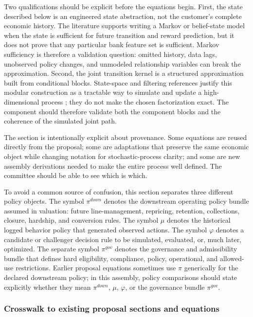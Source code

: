\documentclass[11pt]{article}
\newcommand{\1}{\mathbf{1}}
\begin{document}
Two qualifications should be explicit before the equations begin. First, the
state described below is an engineered state abstraction, not the customer's
complete economic history. The literature supports writing a Markov or
belief-state model when the state is sufficient for future transition and reward
prediction, but it does not prove that any particular bank feature set is
sufficient. Markov sufficiency is therefore a validation question: omitted
history, data lags, unobserved policy changes, and unmodeled relationship
variables can break the approximation. Second, the joint transition kernel is a
structured approximation built from conditional blocks. State-space and
filtering references justify this modular construction as a tractable way to
simulate and update a high-dimensional process
\citep{durbinkoopman2012ssm,westharrison1997bfdm,doucet2001smc,
ledoux2005recursivefilters}; they do not make the chosen factorization exact.
The component should therefore validate both the component blocks and the
coherence of the simulated joint path.

The section is intentionally explicit about provenance. Some equations are
reused directly from the proposal; some are adaptations that preserve the same
economic object while changing notation for stochastic-process clarity; and some
are new assembly derivations needed to make the entire process well defined. The
committee should be able to see which is which.

To avoid a common source of confusion, this section separates three different
policy objects. The symbol $\pi^{down}$ denotes the downstream operating policy
bundle assumed in valuation: future line-management, repricing, retention,
collections, closure, hardship, and conversion rules. The symbol $\mu$ denotes
the historical logged behavior policy that generated observed actions. The
symbol $\varphi$ denotes a candidate or challenger decision rule to be simulated,
evaluated, or, much later, optimized. The separate symbol $\pi^{gov}$ denotes
the governance and admissibility bundle that defines hard eligibility,
compliance, policy, operational, and allowed-use restrictions. Earlier proposal
equations sometimes use $\pi$ generically for the declared downstream policy; in
this assembly, policy comparisons should state explicitly whether they mean
$\pi^{down}$, $\mu$, $\varphi$, or the governance bundle $\pi^{gov}$.

\subsubsection{Crosswalk to existing proposal sections and equations}
\label{subsec:state-space-crosswalk}
\end{document}
